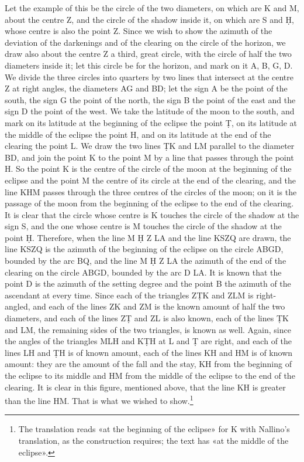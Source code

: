 \documentclass[11pt]{article}
\newcommand{\ArPage}[1]{\marginpar{\footnotesize\color{gray}Ar.\,p.\,#1}}
\begin{document}
\par \ArPage{156}Let the example of this be the circle of the two diameters, on which are K and M, about the centre Z, and the circle of the shadow inside it, on which are S and Ḥ, whose centre is also the point Z. Since we wish to show the azimuth of the deviation of the darkenings and of the clearing on the circle of the horizon, we draw also about the centre Z a third, great circle, with the circle of half the two diameters inside it; let this circle be for the horizon, and mark on it A, B, G, D. We divide the three circles into quarters by two lines that intersect at the centre Z at right angles, the diameters AG and BD; let the sign A be the point of the south, the sign G the point of the north, the sign B the point of the east and the sign D the point of the west. We take the latitude of the moon to the south, and mark on its latitude at the beginning of the eclipse the point Ṭ, on its latitude at the middle of the eclipse the point H, and on its latitude at the end of the clearing the point L. We draw the two lines ṬK and LM parallel to the diameter BD, and join the point K to the point M by a line that passes through the point H. So the point K is the centre of the circle of the moon at the beginning of the eclipse and the point M the centre of its circle at the end of the clearing, and the line KHM passes through the three centres of the circles of the moon; on it is the passage of the moon from the beginning of the eclipse to the end of the clearing. It is clear that the circle whose centre is K touches the circle of the shadow at the sign S, and the one whose centre is M touches the circle of the shadow at the point Ḥ. Therefore, when the line M Ḥ Z LA and the line KSZQ are drawn, the line KSZQ is the azimuth of the beginning of the eclipse on the circle ABGD, bounded by the arc BQ, and the line M Ḥ Z LA the azimuth of the end of the clearing on the circle ABGD, bounded by the arc D LA. It is known that the point D is the azimuth of the setting degree and the point B the azimuth of the ascendant at every time. Since each of the triangles ZṬK and ZLM is right-angled, and each of the lines ZK and ZM is the known amount of half the two diameters, and each of the lines ZṬ and ZL is also known, each of the lines ṬK and LM, the remaining sides of the two triangles, is known as well. Again, since the angles of the triangles MLH and KṬH at L and Ṭ are right, and each of the lines LH and ṬH is of known amount, each of the lines KH and HM is of known amount: they are the amount of the fall and the stay, KH from the beginning of the eclipse to its middle and HM from the middle of the eclipse to the end of the clearing. It is clear in this figure, mentioned above, that the line KH is greater than the line HM. That is what we wished to show.\footnote{The translation reads «at the beginning of the eclipse» for K with Nallino's translation, as the construction requires; the text has «at the middle of the eclipse».}\par
\end{document}
